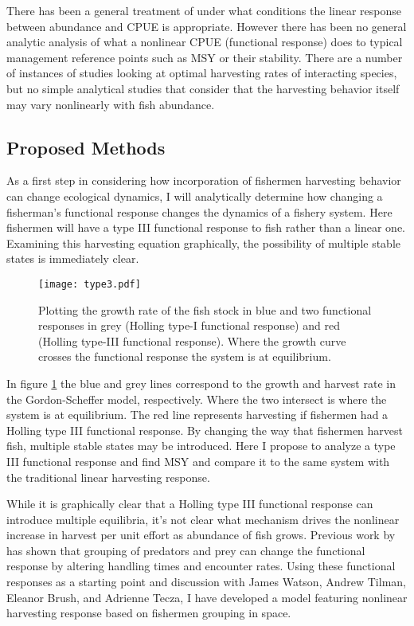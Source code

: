 \documentclass[12pt,a4paper]{report}
\begin{document}
There has been a general treatment of under what conditions the linear response between abundance and CPUE is appropriate. However there has been no general analytic analysis of what a nonlinear CPUE (functional response) does to typical management reference points such as MSY or their stability. There are a number of instances of studies looking at optimal harvesting rates of interacting species, but no simple analytical studies that consider that the harvesting behavior itself may vary nonlinearly with fish abundance. 

\subsection{Proposed Methods}
As a first step in considering how incorporation of fishermen harvesting behavior can change ecological dynamics, I will analytically determine how changing a fisherman's functional response changes the dynamics of a fishery system. Here fishermen will have a type III functional response to fish rather than a linear one. Examining this harvesting equation graphically, the possibility of multiple stable states is immediately clear.

\begin{figure}
\centering
\texttt{[image: type3.pdf]}
\caption{\small Plotting the growth rate of the fish stock in blue and two functional responses in grey (Holling type-I functional response) and red (Holling type-III functional response). Where the growth curve crosses the functional response the system is at equilibrium. \label{type3}}
\end{figure}

In figure \ref{type3} the blue and grey lines correspond to the growth and harvest rate in the Gordon-Scheffer model, respectively. Where the two intersect is where the system is at equilibrium. The red line represents harvesting if fishermen had a Holling type III functional response. By changing the way that fishermen harvest fish, multiple stable states may be introduced. Here I propose to analyze a type III functional response and find MSY and compare it to the same system with the traditional linear harvesting response. 

While it is graphically clear that a Holling type III functional response can introduce multiple equilibria, it's not clear what mechanism drives the nonlinear increase in harvest per unit effort as abundance of fish grows.  Previous work by \cite{Fryxelletal:2007} has shown that grouping of predators and prey can change the functional response by altering handling times and encounter rates. Using these functional responses as a starting point and discussion with James Watson, Andrew Tilman, Eleanor Brush, and Adrienne Tecza, I have developed a model featuring nonlinear harvesting response based on fishermen grouping in space. 
\end{document}
